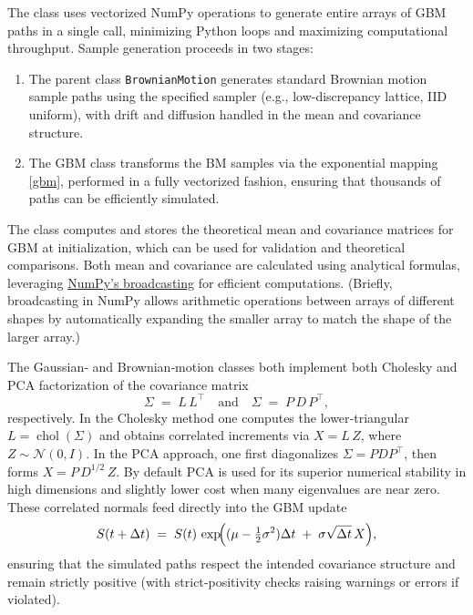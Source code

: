 \documentclass{article}
\begin{document}
The class uses vectorized NumPy operations to generate entire arrays of GBM paths in a single call, minimizing Python loops and maximizing computational throughput. Sample generation proceeds in two stages:
\begin{enumerate}
\item 
The parent class \texttt{BrownianMotion} generates standard Brownian motion sample paths using the specified sampler (e.g., low-discrepancy lattice, IID uniform), with drift and diffusion handled in the mean and covariance structure.
\item  The GBM class transforms the BM samples via the exponential mapping    \eqref{gbm}, performed in a fully vectorized fashion, ensuring that thousands of paths can be efficiently simulated.
\end{enumerate}
The class computes and stores the theoretical mean and covariance matrices for GBM at initialization, which can be used for validation and theoretical comparisons. Both mean and covariance are calculated using analytical formulas, leveraging \href{https://numpy.org/devdocs/user/basics.broadcasting.html}{NumPy’s broadcasting} for efficient computations. (Briefly, broadcasting in NumPy allows arithmetic operations between arrays of different shapes by automatically expanding the smaller array to match the shape of the larger array.)

 The Gaussian‐ and Brownian‐motion classes both implement both Cholesky and PCA factorization of the covariance matrix
\[
\Sigma \;=\; L\,L^{\!\top}
\quad\text{and}\quad
\Sigma \;=\; P\,D\,P^{\!\top},
\]
respectively.  In the Cholesky method one computes the lower‐triangular $L=\operatorname{chol}(\Sigma)$ and obtains correlated increments via $X=L\,Z$, where $Z\sim\mathcal{N}(0,I)$.  In the PCA approach, one first diagonalizes $\Sigma=PDP^{\!\top}$, then forms $X = P\,D^{1/2}\,Z$.  By default PCA is used for its superior numerical stability in high dimensions and slightly lower cost when many eigenvalues are near zero.  These correlated normals feed directly into the GBM update
\[
S(t+\Delta t) \;=\; S(t)\,\exp\!\Bigl((\mu - \tfrac12\sigma^2)\Delta t \;+\;\sigma\sqrt{\Delta t}\,X\Bigr),
\]
ensuring that the simulated paths respect the intended covariance structure and remain strictly positive (with strict‐positivity checks raising warnings or errors if violated).
\end{document}
